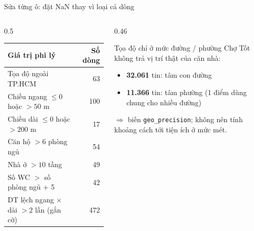 \documentclass[aspectratio=169,11pt]{beamer}
\newcommand{\num}[1]{{\color{accentdark}\bfseries #1}}
\newcommand{\ghichu}[1]{{\color{muted}\footnotesize #1}}
\begin{document}
\begin{frame}{Sửa từng ô: đặt NaN thay vì loại cả dòng}
  \begin{columns}[T]
    \begin{column}{0.5\linewidth}
      \footnotesize
      \begin{tabular}{@{}lr@{}}
        \toprule
        Giá trị phi lý & Số dòng \\ \midrule
        Tọa độ ngoài TP.HCM & 63 \\
        Chiều ngang $\le 0$ hoặc $> 50$ m & 100 \\
        Chiều dài $\le 0$ hoặc $> 200$ m & 17 \\
        Căn hộ $> 6$ phòng ngủ & 54 \\
        Nhà ở $> 10$ tầng & 49 \\
        Số WC $>$ số phòng ngủ + 5 & 42 \\ \midrule
        DT lệch ngang × dài $> 2$ lần \ghichu{(gắn cờ)} & 472 \\
        \bottomrule
      \end{tabular}
    \end{column}
    \begin{column}{0.46\linewidth}
      \begin{block}{Tọa độ chỉ ở mức đường / phường}
        \small
        Chợ Tốt không trả vị trí thật của căn nhà:
        \begin{itemize}
          \item \num{32.061} tin: tâm con đường
          \item \num{11.366} tin: tâm phường (1 điểm dùng chung cho nhiều đường)
        \end{itemize}
        $\Rightarrow$ biến \texttt{geo\_precision}; không nên tính khoảng cách tới tiện ích ở mức mét.
      \end{block}
    \end{column}
  \end{columns}
\end{frame}
\end{document}
